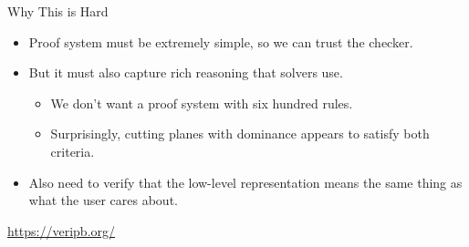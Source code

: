 \documentclass[aspectratio=169,compress,10pt]{beamer}
\begin{document}
\begin{frame}{Why This is Hard}
    \begin{itemize}
        \item Proof system must be extremely simple, so we can trust the checker.
        \item But it must also capture rich reasoning that solvers use.
            \begin{itemize}
                \item We don't want a proof system with six hundred rules.
                \item Surprisingly, cutting planes with dominance appears to satisfy both criteria.
            \end{itemize}
        \item Also need to verify that the low-level representation means the same thing as what the
            user cares about.
    \end{itemize}

    \bigskip

    \begin{center}
        \url{https://veripb.org/}
    \end{center}
\end{frame}
\end{document}
